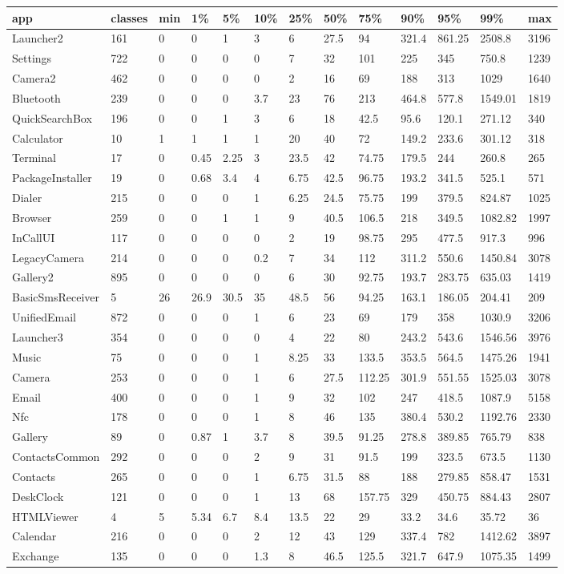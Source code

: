 \begin{tabular}{|l|l|l|l|l|l|l|l|l|l|l|l|l|}
\hline
app&classes&min&1\%&5\%&10\%&25\%&50\%&75\%&90\%&95\%&99\%&max\\
\hline
Launcher2&161&0&0&1&3&6&27.5&94&321.4&861.25&2508.8&3196\\
\hline
Settings&722&0&0&0&0&7&32&101&225&345&750.8&1239\\
\hline
Camera2&462&0&0&0&0&2&16&69&188&313&1029&1640\\
\hline
Bluetooth&239&0&0&0&3.7&23&76&213&464.8&577.8&1549.01&1819\\
\hline
QuickSearchBox&196&0&0&1&3&6&18&42.5&95.6&120.1&271.12&340\\
\hline
Calculator&10&1&1&1&1&20&40&72&149.2&233.6&301.12&318\\
\hline
Terminal&17&0&0.45&2.25&3&23.5&42&74.75&179.5&244&260.8&265\\
\hline
PackageInstaller&19&0&0.68&3.4&4&6.75&42.5&96.75&193.2&341.5&525.1&571\\
\hline
Dialer&215&0&0&0&1&6.25&24.5&75.75&199&379.5&824.87&1025\\
\hline
Browser&259&0&0&1&1&9&40.5&106.5&218&349.5&1082.82&1997\\
\hline
InCallUI&117&0&0&0&0&2&19&98.75&295&477.5&917.3&996\\
\hline
LegacyCamera&214&0&0&0&0.2&7&34&112&311.2&550.6&1450.84&3078\\
\hline
Gallery2&895&0&0&0&0&6&30&92.75&193.7&283.75&635.03&1419\\
\hline
BasicSmsReceiver&5&26&26.9&30.5&35&48.5&56&94.25&163.1&186.05&204.41&209\\
\hline
UnifiedEmail&872&0&0&0&1&6&23&69&179&358&1030.9&3206\\
\hline
Launcher3&354&0&0&0&0&4&22&80&243.2&543.6&1546.56&3976\\
\hline
Music&75&0&0&0&1&8.25&33&133.5&353.5&564.5&1475.26&1941\\
\hline
Camera&253&0&0&0&1&6&27.5&112.25&301.9&551.55&1525.03&3078\\
\hline
Email&400&0&0&0&1&9&32&102&247&418.5&1087.9&5158\\
\hline
Nfc&178&0&0&0&1&8&46&135&380.4&530.2&1192.76&2330\\
\hline
Gallery&89&0&0.87&1&3.7&8&39.5&91.25&278.8&389.85&765.79&838\\
\hline
ContactsCommon&292&0&0&0&2&9&31&91.5&199&323.5&673.5&1130\\
\hline
Contacts&265&0&0&0&1&6.75&31.5&88&188&279.85&858.47&1531\\
\hline
DeskClock&121&0&0&0&1&13&68&157.75&329&450.75&884.43&2807\\
\hline
HTMLViewer&4&5&5.34&6.7&8.4&13.5&22&29&33.2&34.6&35.72&36\\
\hline
Calendar&216&0&0&0&2&12&43&129&337.4&782&1412.62&3897\\
\hline
Exchange&135&0&0&0&1.3&8&46.5&125.5&321.7&647.9&1075.35&1499\\
\hline
\end{tabular}
